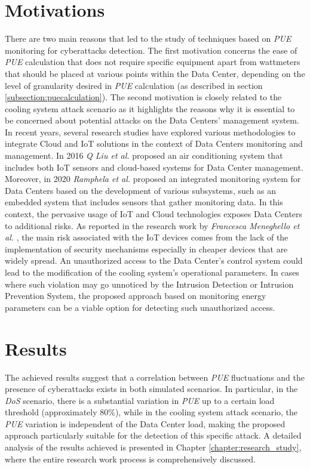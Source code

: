 \section{Motivations}
There are two main reasons that led to the study of techniques based on \emph{PUE} monitoring for cyberattacks detection. The first motivation concerns the ease of \emph{PUE} calculation that does not require specific equipment apart from wattmeters that should be placed at various points within the Data Center, depending on the level of granularity desired in \emph{PUE} calculation (as described in section \ref{subsection:puecalculation}). The second motivation is closely related to the cooling system attack scenario as it highlights the reasons why it is essential to be concerned about potential attacks on the Data Centers' management system. In recent years, several research studies have explored various methodologies to integrate Cloud and IoT solutions in the context of Data Centers monitoring and management. In 2016 \emph{Q Liu et al.} \cite{liu2016green} proposed an air conditioning system that includes both IoT sensors and cloud-based systems for Data Center management. Moreover, in 2020 \emph{Ramphela et al.} \cite{ramphela2020internet} proposed an integrated monitoring system for Data Centers based on the development of various subsystems, such as an embedded system that includes sensors that gather monitoring data. In this context, the pervasive usage of IoT and Cloud technologies exposes Data Centers to additional risks. As reported in the research work by \emph{Francesca Meneghello et al.} \cite{meneghello2019iot}, the main risk associated with the IoT devices comes from the lack of the implementation of security mechanisms especially in cheaper devices that are widely spread. An unauthorized access to the Data Center's control system could lead to the modification of the cooling system's operational parameters. In cases where such violation may go unnoticed by the Intrusion Detection or Intrusion Prevention System, the proposed approach based on monitoring energy parameters can be a viable option for detecting such unauthorized access.


\section{Results}
The achieved results suggest that a correlation between \emph{PUE} fluctuations and the presence of cyberattacks exists in both simulated scenarios. In particular, in the \emph{DoS} scenario, there is a substantial variation in \emph{PUE} up to a certain load threshold (approximately 80\%), while in the cooling system attack scenario, the \emph{PUE} variation is independent of the Data Center load, making the proposed approach particularly suitable for the detection of this specific attack. A detailed analysis of the results achieved is presented in Chapter \ref{chapter:research_study}, where the entire research work process is comprehensively discussed.

